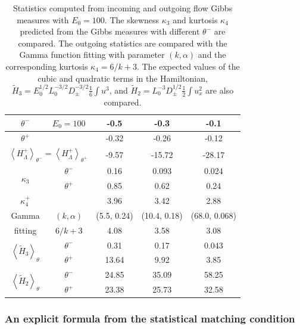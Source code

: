 \documentclass[9pt,twoside,lineno]{pnas-new}
\theoremstyle{plain}
\theoremstyle{plain}
\begin{document}
\begin{table}
\begin{centering}
\begin{tabular}{ccccc}
\toprule 
$\theta^{-}$ & $E_{0}=100$ & -0.5  & -0.3  & -0.1 \tabularnewline
\midrule
\midrule 
$\theta^{+}$ &  & -0.32  & -0.26  & -0.12 \tabularnewline
\midrule 
\multicolumn{2}{c}{$\left\langle H_{\Lambda}^{+}\right\rangle _{\theta^{-}}=\left\langle H_{\Lambda}^{+}\right\rangle _{\theta^{+}}$} & -9.57 & -15.72 & -28.17\tabularnewline
\midrule
\midrule 
\multirow{2}{*}{$\kappa_{3}$} & $\theta^{-}$ & 0.16 & 0.093 & 0.024\tabularnewline
\cmidrule{2-5} 
 & $\theta^{+}$ & 0.85 & 0.62 & 0.24\tabularnewline
\midrule
\multirow{1}{*}{$\kappa_{4}^{+}$} &  & 3.96 & 3.42 & 2.88\tabularnewline
\midrule
Gamma  & $\left(k,\alpha\right)$ & (5.5, 0.24) & (10.4, 0.18) & (68.0, 0.068)\tabularnewline
\cmidrule{2-5} 
fitting & $6/k+3$ & 4.08 & 3.58 & 3.08\tabularnewline
\midrule
\midrule 
\multirow{2}{*}{$\left\langle \tilde{H}_{3}\right\rangle _{\theta}$} & $\theta^{-}$ & 0.31 & 0.17 & 0.043\tabularnewline
\cmidrule{2-5} 
 & $\theta^{+}$ & 13.64 & 9.92 & 3.85\tabularnewline
\midrule 
\multirow{2}{*}{$\left\langle \tilde{H}_{2}\right\rangle _{\theta}$} & $\theta^{-}$ & 24.85 & 35.09 & 58.25\tabularnewline
\cmidrule{2-5} 
 & $\theta^{+}$ & 23.38 & 25.73 & 32.58\tabularnewline
\bottomrule
\end{tabular}
\par\end{centering}
\caption{Statistics computed from incoming and outgoing flow Gibbs measures
with $E_{0}=100$. The skewness $\kappa_{3}$ and kurtosis $\kappa_{4}$
predicted from the Gibbs measures with different $\theta^{-}$ are
compared. The outgoing statistics are compared with the Gamma function
fitting with parameter $\left(k,\alpha\right)$ and the corresponding
kurtosis $\kappa_{4}=6/k+3$. The expected values of the cubic and
quadratic terms in the Hamiltonian, $\tilde{H}_{3}=E_{0}^{1/2}L_{0}^{-3/2}D_{\pm}^{-3/2}\frac{1}{6}\int u^{3}$,
and $\tilde{H}_{2}=L_{0}^{-3}D_{\pm}^{1/2}\frac{1}{2}\int u_{x}^{2}$
are also compared.\label{tab:Statistics-matching}}
\end{table}

\subsubsection*{An explicit formula from the statistical matching condition}
\end{document}

